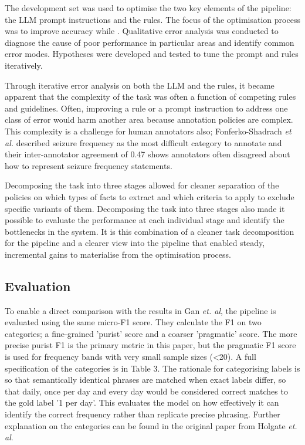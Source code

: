 \documentclass[conference]{IEEEtran}
\begin{document}
The development set was used to optimise the two key 
elements of the pipeline: the LLM prompt instructions and 
the rules. The focus of the optimisation process was to 
improve accuracy while . Qualitative error analysis was 
conducted to diagnose the cause of poor performance 
in particular areas and identify common error modes. 
Hypotheses were developed and tested to tune the 
prompt and rules iteratively. 

Through iterative error analysis on both the LLM and 
the rules, it became apparent that the complexity of the 
task was often a function of competing rules and 
guidelines. Often, improving a rule or a prompt 
instruction to address one class of error would harm 
another area because annotation policies are complex.
This complexity is a challenge for human annotators 
also; Fonferko-Shadrach \emph{et al.} described seizure
frequency as the most difficult category to annotate
and their inter-annotator agreement of 0.47 shows 
annotators often disagreed about how to represent
seizure frequency statements.

Decomposing the task into three stages allowed for 
cleaner separation of the policies on which types of 
facts to extract and which criteria to apply to exclude
specific variants of them. Decomposing the task into
three stages also made it possible to evaluate the 
performance at each individual stage and identify the 
bottlenecks in the system. It is this combination of 
a cleaner task decomposition for the pipeline and a
clearer view into the pipeline that enabled steady,
incremental gains to materialise from the optimisation
process.

\subsection{Evaluation}

To enable a direct comparison with the results in Gan \emph{et. al},
the pipeline is evaluated using the same micro-F1 score. They 
calculate the F1 on two categories; a fine-grained 'purist' score
and a coarser 'pragmatic' score. The more precise purist F1 is 
the primary metric in this paper, but the pragmatic F1 score is 
used for frequency bands with very small sample sizes (\textless20). A 
full specification of the categories is in Table 3. The rationale for 
categorising labels is so that semantically identical phrases 
are matched when exact labels differ, so that daily, once per day 
and every day would be considered correct matches to the gold
label '1 per day'. This evaluates the model on how effectively
it can identify the correct frequency rather than replicate 
precise phrasing. Further explanation on the categories can be
found in the original paper from Holgate \emph{et. al}.
\end{document}
